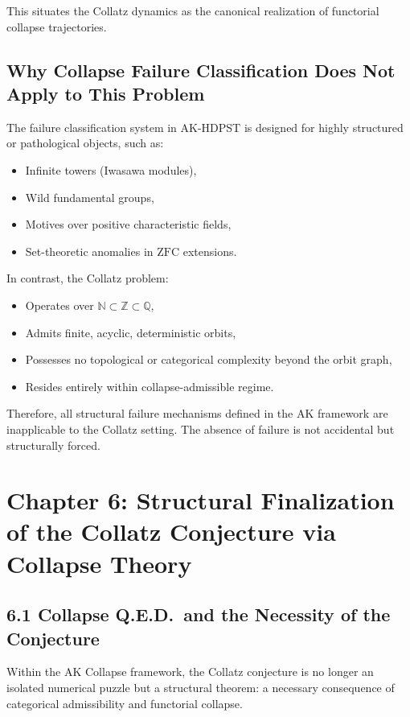 \documentclass[11pt]{article}
\begin{document}
This situates the Collatz dynamics as the canonical realization of functorial collapse trajectories.

\subsection{Why Collapse Failure Classification Does Not Apply to This Problem}

The failure classification system in AK-HDPST is designed for highly structured or pathological objects, such as:
\begin{itemize}
  \item Infinite towers (Iwasawa modules),
  \item Wild fundamental groups,
  \item Motives over positive characteristic fields,
  \item Set-theoretic anomalies in \( \mathrm{ZFC} \) extensions.
\end{itemize}

In contrast, the Collatz problem:
\begin{itemize}
  \item Operates over \( \mathbb{N} \subset \mathbb{Z} \subset \mathbb{Q} \),
  \item Admits finite, acyclic, deterministic orbits,
  \item Possesses no topological or categorical complexity beyond the orbit graph,
  \item Resides entirely within collapse-admissible regime.
\end{itemize}

Therefore, all structural failure mechanisms defined in the AK framework are inapplicable to the Collatz setting. The absence of failure is not accidental but structurally forced.



\section{Chapter 6: Structural Finalization of the Collatz Conjecture via Collapse Theory}
\label{sec:collapse-qed}

\subsection{6.1 Collapse Q.E.D.\ and the Necessity of the Conjecture}

Within the AK Collapse framework, the Collatz conjecture is no longer an isolated numerical puzzle but a structural theorem: a necessary consequence of categorical admissibility and functorial collapse.
\end{document}
